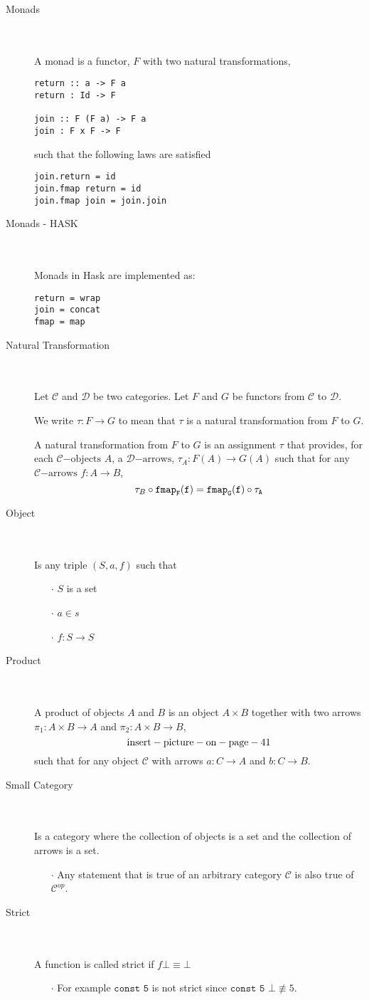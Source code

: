 \documentclass[10pt]{article}
\newcommand{\arr}[1]{\mathcal{#1}\mathrm{-arrows}}
\newcommand{\obj}[1]{\mathcal{#1}\mathrm{-objects}}
\newcommand{\state}[1]{\item[#1] \textcolor{white}{.} \\ \textcolor{white}{.} \\ }
\newcommand{\func}[3]{#1 : #2 \rightarrow #3}
\newcommand{\CC}{\mathcal{C}}
\newcommand{\DD}{\mathcal{D}}
\newcommand{\point}[1]{\begin{itemize} \item[$\cdot$] #1 \end{itemize}}
\begin{document}
\begin{description}
\state{Monads}
A monad is a functor, $F$ with two natural transformations,
\begin{verbatim}
return :: a -> F a
return : Id -> F

join :: F (F a) -> F a
join : F x F -> F
\end{verbatim}

such that the following laws are satisfied

\begin{verbatim}
join.return = id
join.fmap return = id
join.fmap join = join.join
\end{verbatim}

\state{Monads - HASK}
Monads in Hask are implemented as:
\begin{verbatim}
return = wrap
join = concat
fmap = map
\end{verbatim}

\state{Natural Transformation}
Let $\CC$ and $\DD$ be two categories. Let $F$ and $G$ be functors from $\CC$ to $\DD$.

We write $\func{\tau}{F}{G}$ to mean that $\tau$ is a natural transformation from $F$ to $G$.

A natural transformation from $F$ to $G$ is an assignment $\tau$ that provides, for each $\obj{C}$ $A$, a $\arr{D}$, $\func{\tau_A}{F(A)}{G(A)}$ such that for any $\arr{C}$ $\func{f}{A}{B}$,
$$ \tau_B \circ \tt{fmap}_F(f)= \tt{fmap}_G (f) \circ \tau_A$$

\state{Object}
Is any triple $(S,a,f)$ such that
\point{$S$ is a set}
\point{$a \in s$}
\point{$\func{f}{S}{S}$}

\state{Product}
A product of objects $A$ and $B$ is an object $A \times B$ together with two arrows $\func{\pi_1}{A \times B}{A}$ and $\func{\pi_2}{A \times B}{B}$,
$$ \rm{insert-picture-on-page-41} $$
such that for any object $\CC$ with arrows $\func{a}{C}{A}$ and $\func{b}{C}{B}$.

\state{Small Category} Is a category where the collection of objects is a set and the collection of arrows is a set.

\point{Any statement that is true of an arbitrary category $\CC$ is also true of $\mathcal{C}^{op}$.}


\state{Strict}
A function is called strict if $f \bot \equiv \bot$

\point{For example $\texttt{const 5}$ is not strict since $\texttt{const 5 } \bot \not\equiv 5$.}



\end{description}
\end{document}
